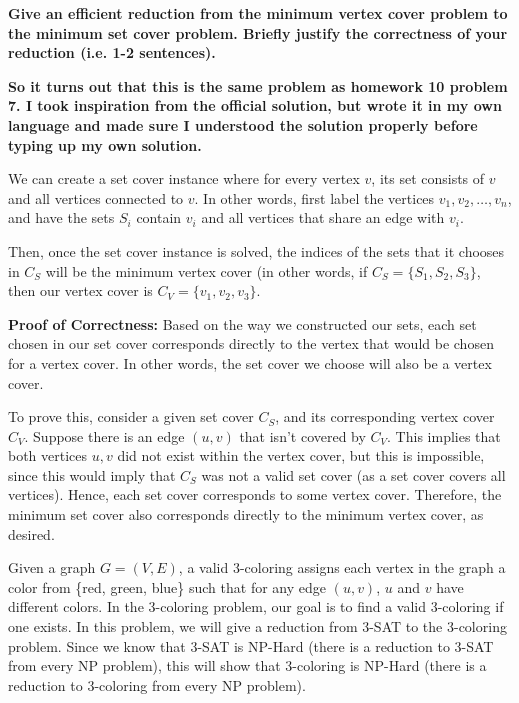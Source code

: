 \documentclass[11pt]{article}
\begin{document}
\textbf{Give an efficient reduction from the minimum vertex cover problem to the minimum set cover problem. Briefly justify the correctness of your reduction (i.e. 1-2 sentences).}

\begin{solution}
	\textbf{So it turns out that this is the same problem as homework 10 problem 7. I took inspiration from the 
		official solution, but wrote it in my own language and made sure I understood the solution properly 
	before typing up my own solution.}

	We can create a set cover instance where for every vertex \( v \), its set consists of \( v \) and all 
	vertices connected to \( v \). In other words, first label the vertices \( v_1, v_2, \dots, v_n \), and 
	have the sets \( S_i \) contain \( v_i \) and all vertices that share an edge with \( v_i \).
	
	Then, once the set cover instance is solved, the indices of the sets that it chooses in \( C_S \) will be 
	the minimum vertex cover (in other words, if \( C_S = \{S_1, S_2, S_3\}  \), then our vertex cover is 
	\( C_V = \{v_1, v_2, v_3\}  \).

	\textbf{Proof of Correctness:} Based on the way we constructed our sets, each set chosen in our set cover 
	corresponds directly to the vertex that would be chosen for a vertex cover. In other words, the set cover 
	we choose will also be a vertex cover. 

	To prove this, consider a given set cover \( C_S \), and its corresponding vertex cover \( C_V \). Suppose 
	there is an edge \( (u, v) \) that isn't covered by \( C_V \). This implies that both vertices \( u, v \) did
	not exist within the vertex cover, but this is impossible, since this would imply that \( C_S \) was not 
	a valid set cover (as a set cover covers all vertices). Hence, each set cover corresponds to some vertex
	cover. Therefore, the minimum set 
	cover also corresponds directly to the minimum vertex cover, as desired. 
\end{solution}

\newpage


Given a graph $G = (V, E)$, a valid 3-coloring assigns each vertex in the graph a color from \{red, green, blue\} such that for any edge $(u, v)$, $u$ and $v$ have different colors. In the 3-coloring problem, our goal is to find a valid 3-coloring if one exists. In this problem, we will give a reduction from 3-SAT to the 3-coloring problem. Since we know that 3-SAT is NP-Hard (there is a reduction to 3-SAT from every NP problem), this will show that 3-coloring is NP-Hard (there is a reduction to 3-coloring from every NP problem).
\end{document}
